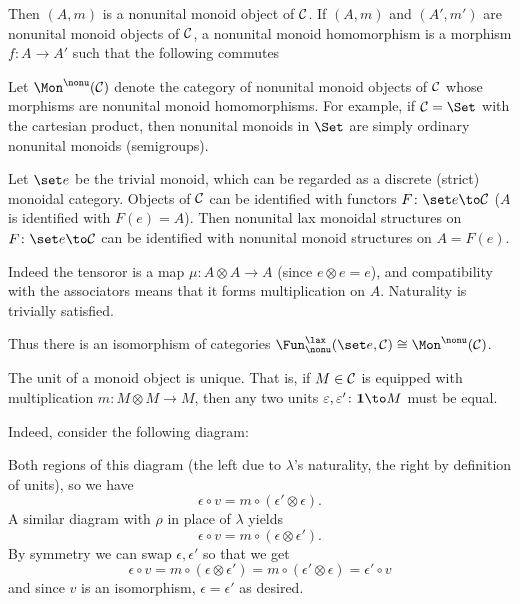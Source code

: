     Then $(A,m)$ is a {\emphcolor nonunital monoid object} of ${{\cal C}}$.
    If $(A,m)$ and $(A',m')$ are nonunital monoid objects of ${{\cal C}}$, a {\emphcolor nonunital monoid homomorphism} is a morphism $f\colon A\to A'$ such that the following commutes


    Let $\Mon^\nonu(\C)$ denote the category of nonunital monoid objects of ${{\cal C}}$ whose morphisms are nonunital monoid homomorphisms.
    For example, if $\C=\Set$ with the cartesian product, then nonunital monoids in $\Set$ are simply ordinary nonunital monoids (semigroups).

    Let $\set e$ be the trivial monoid, which can be regarded as a discrete (strict) monoidal category.
    Objects of ${{\cal C}}$ can be identified with functors $F\colon\set e\to\C$ ($A$ is identified with $F(e)=A$).
    Then nonunital lax monoidal structures on $F\colon\set e\to\C$ can be identified with nonunital monoid structures on $A=F(e)$.

    Indeed the tensoror is a map $\mu\colon A\otimes A\to A$ (since $e\otimes e=e$), and compatibility with the associators means that it forms multiplication on $A$.
    Naturality is trivially satisfied.

    Thus there is an isomorphism of categories $\Fun^\lax_\nonu(\set e,\C)\cong\Mon^\nonu(\C)$.

\eexam

\bnote

    The unit of a monoid object is unique.
    That is, if $M\in{{\cal C}}$ is equipped with multiplication $m\colon M\otimes M\to M$, then any two units $\epsilon,\epsilon'\colon\1\to M$ must be
    equal.

    Indeed, consider the following diagram:


    Both regions of this diagram (the left due to $\lambda$'s naturality, the right by definition of units), so we have
    $$ \epsilon\circ v = m\circ(\epsilon'\otimes\epsilon) . $$
    A similar diagram with $\rho$ in place of $\lambda$ yields
    $$ \epsilon\circ v = m\circ(\epsilon\otimes\epsilon') . $$
    By symmetry we can swap $\epsilon,\epsilon'$ so that we get
    $$ \epsilon\circ v = m\circ(\epsilon\otimes\epsilon') = m\circ(\epsilon'\otimes\epsilon) = \epsilon'\circ v $$
    and since $v$ is an isomorphism, $\epsilon=\epsilon'$ as desired.

